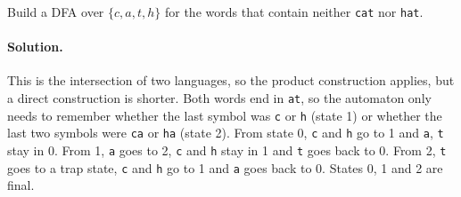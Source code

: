 \begin{exercise}
\label{ex:neither}
Build a DFA over $\{c, a, t, h\}$ for the words that contain neither
\texttt{cat} nor \texttt{hat}.
\end{exercise}

\paragraph{Solution.} This is the intersection of two languages, so the
product construction applies, but a direct construction is shorter. Both
words end in \texttt{at}, so the automaton only needs to remember whether the
last symbol was \texttt{c} or \texttt{h} (state 1) or whether the last two
symbols were \texttt{ca} or \texttt{ha} (state 2). From state 0, \texttt{c} and
\texttt{h} go to 1 and \texttt{a}, \texttt{t} stay in 0. From 1, \texttt{a} goes
to 2, \texttt{c} and \texttt{h} stay in 1 and \texttt{t} goes back to 0. From 2,
\texttt{t} goes to a trap state, \texttt{c} and \texttt{h} go to 1 and \texttt{a}
goes back to 0. States 0, 1 and 2 are final.
